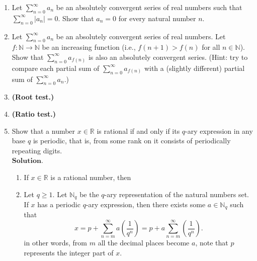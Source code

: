 \documentclass{article}
\theoremstyle{remark}
\begin{document}
\begin{enumerate}
\begin{enumerate}
        In fact, we also know that since $\sum_{n=1}^{\infty}a_n$ is a positive terms series, there exists some $M \geq 0$ such that
        for any $N \geq 0$
        \[
        \sum_{n=0}^{N} a_n \leq M.
        \]

        \item[$(\impliedby)$]
    \end{enumerate}

    \item Let $\sum_{n=0}^\infty a_n$ be an absolutely convergent series of real numbers such that 
    $\sum_{n=0}^\infty |a_n| = 0$. Show that $a_n = 0$ for every natural number $n$.

    \item Let $\sum_{n=0}^{\infty} a_n$ be an absolutely convergent series of real numbers.  
    Let $f \colon \mathbb{N} \to \mathbb{N}$ be an increasing function 
    (i.e., $f(n+1) > f(n)$ for all $n \in \mathbb{N}$).  
    Show that $\sum_{n=0}^{\infty} a_{f(n)}$ is also an absolutely convergent series. 
    (Hint: try to compare each partial sum of $\sum_{n=0}^{\infty} a_{f(n)}$ with a 
    (slightly different) partial sum of $\sum_{n=0}^{\infty} a_n$.)

    \item \textbf{(Root test.)}
    
    \item \textbf{(Ratio test.)}
    
    

    \item Show that a number \( x \in \mathbb{R} \) is rational 
    if and only if its \( q \)-ary expression in any base \( q \) is periodic, 
    that is, from some rank on it consists of periodically repeating digits.
    \\ 
    $\textbf{Solution.}$
    \begin{enumerate}
        \item[$(\implies)$]
        If $x \in \mathbb{R}$ is a rational number, then 
        \item[$(\impliedby)$] 
        Let $q \geq 1$.
        Let $\mathbb{N}_{q}$ be the $q$-ary representation of the natural numbers set.
        If $x$ has a periodic $q$-ary expression, then there exists some 
        $a \in \mathbb{N}_q$ such that
        \[
        x = p + \sum_{n=m}^{\infty} a\left(\frac{1}{q^n} \right) = p + a\sum_{n=m}^{\infty}\left(\frac{1}{q^n}\right).
        \]
        in other words, from $m$ all the decimal places become $a$, note that $p$ represents the integer part of $x$.
        

\end{enumerate}
\end{enumerate}
\end{document}
